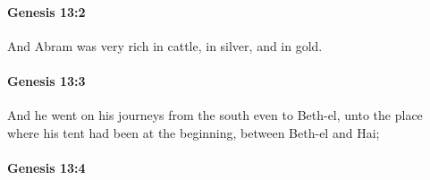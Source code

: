
		\paragraph{Genesis 13:2} %
			\label{GENESIS-13-2}

			And Abram was very rich in cattle, in silver, and in gold.


		\paragraph{Genesis 13:3} %
			\label{GENESIS-13-3}

			And he went on his journeys from the south even to Beth-el, unto the place where his tent had been at the beginning, between Beth-el and Hai;


		\paragraph{Genesis 13:4} %
			\label{GENESIS-13-4}

